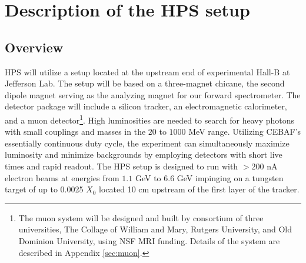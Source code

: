 \section{Description of the HPS setup}
\label{setup}

\subsection{Overview } 


HPS will utilize a setup located at the upstream end of  experimental Hall-B at Jefferson Lab. The setup will be based on a three-magnet chicane, the second dipole magnet serving as the analyzing magnet for our forward spectrometer. The detector package will include a silicon tracker, an electromagnetic calorimeter, and a muon detector\footnote{The muon system will be designed and built by consortium of three universities, The Collage of William and Mary, Rutgers University, and Old Dominion University, using NSF MRI funding. Details of the system are described in Appendix \ref{sec:muon}.}. High luminosities are needed to search for heavy photons with small couplings and masses in the $20$ to $1000$ MeV range. Utilizing CEBAF's essentially continuous duty cycle, the experiment can simultaneously maximize luminosity and minimize backgrounds by employing detectors with short live times and rapid readout. The HPS setup is designed to run with $> 200$ nA electron beams at energies from $1.1$ GeV to $6.6$ GeV impinging on a tungsten target of up to 0.0025 $X_{0}$ located  10 cm upstream of the first layer of the tracker.

